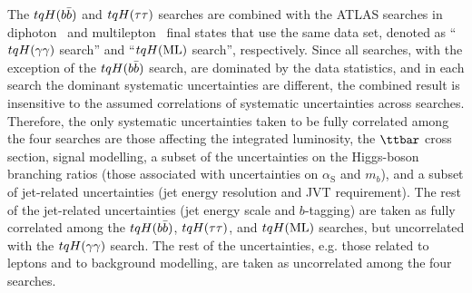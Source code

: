 The $tqH(b\bar{b})$ and $tqH(\tau\tau)$ searches are combined with the ATLAS searches in 
diphoton~\cite{Aaboud:2017mfd} and multilepton~\cite{Aaboud:2018pob} final states that use the same data set, 
denoted as ``$tqH(\gamma\gamma)$ search'' and ``$tqH(\mathrm{ML})$ search'', respectively.
Since all searches, with the exception of the $tqH(b\bar{b})$ search, are dominated by the data statistics, 
and in each search the dominant systematic uncertainties are different, the combined result is 
insensitive to the assumed correlations of systematic uncertainties across searches.
Therefore, the only systematic uncertainties taken to be fully correlated among the four searches are 
those affecting the integrated luminosity, the $\ttbar$ cross section, signal modelling, a subset of the uncertainties
on the Higgs-boson branching ratios (those associated with uncertainties on $\alpha_\mathrm{S}$ and $m_b$), 
and a subset of jet-related uncertainties (jet energy resolution and JVT requirement). 
The rest of the jet-related uncertainties (jet energy scale and $b$-tagging) are taken as fully correlated among 
the $tqH(b\bar{b})$, $tqH(\tau\tau)$, and $tqH(\mathrm{ML})$ searches, but uncorrelated with the $tqH(\gamma\gamma)$ search. The rest of the uncertainties, 
e.g. those related to leptons and to background modelling, are taken as uncorrelated among the four searches. 



